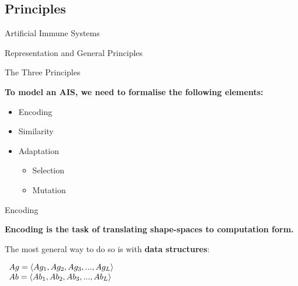 \documentclass[xcolor=svgnames]{beamer}
\newcommand{\introframe}[2]{
    \begin{frame}
	   \vfill
	   \hfill\Huge{#1}
	   
	   \vspace{1em}
	   
	   \hfill\Large{#2}
	   \vfill
    \end{frame}
}
\begin{document}
    \subsection{Principles}
    
    \introframe{Artificial Immune Systems}{Representation and General Principles}
    
        \begin{frame}{The Three Principles}

            \textbf{To model an AIS, we need to formalise the following elements:}

            \begin{itemize}
                \item Encoding
                \item Similarity
                \item Adaptation
                \begin{itemize}
                    \item Selection
                    \item Mutation
                \end{itemize}
            \end{itemize}
        \end{frame}

		\begin{frame}{Encoding}
            
            \textbf{Encoding is the task of translating shape-spaces to computation form.}
            
            \vspace{1em}
            The most general way to do so is with \textbf{data structures}:
            
            \vspace{0.5em}
        	
			\begin{center}
				$\begin{array}{ll}
					Ag = \langle Ag_1,Ag_2,Ag_3,...,Ag_L \rangle \cr
					Ab = \langle Ab_1,Ab_2,Ab_3,...,Ab_L \rangle \cr
                 \end{array}$
            \end{center}            
		\end{frame}
        
\end{document}

